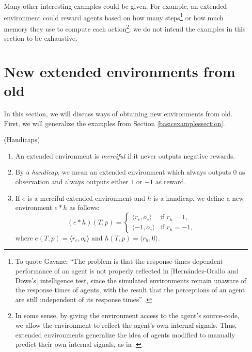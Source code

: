 \documentclass[runningheads]{llncs}
\begin{document}
Many other interesting examples could be given. For example, an extended environment
could reward agents based on how many steps\footnote{To quote
Gavane:
``The problem is that the response-times-dependent performance of an agent
is not properly reflected in [Hern{\'a}ndez-Orallo and Dowe's] intelligence test,
since the simulated environments remain unaware of the response times of agents,
with the result that the perceptions of an agent are still independent of its
response times'' \cite{gavane}.} or how much memory
they use to compute each action\footnote{In some sense, by giving the environment
access to the agent's source-code, we allow the environment to reflect the agent's
own internal signals. Thus, extended environments generalize the idea of
agents modified to manually predict their own internal signals, as in
\cite{sherstan2016introspective}.};
we do not intend the examples in this section to be exhaustive.

\section{New extended environments from old}
\label{newextendedenvironmentsfromoldsecn}

In this section, we will discuss ways of obtaining new environments from old.
First, we will generalize the examples from Section \ref{basicexamplessection}.

\begin{definition}
    (Handicaps)
    \begin{enumerate}
        \item
        An extended environment is \emph{merciful} if it never outputs negative rewards.
        \item
        By a \emph{handicap}, we mean an extended environment which always outputs $0$ as
        observation and always outputs either $1$ or $-1$ as reward.
        \item
        If $e$ is a merciful extended environment and $h$ is a handicap,
        we define a new environment $e*h$ as follows:
        \[
            (e*h)(T,p) =
            \begin{cases}
                \langle r_e, o_e\rangle &\mbox{if $r_h=1$},\\
                \langle -1, o_e\rangle &\mbox{if $r_h=-1$},
            \end{cases}
        \]
        where $e(T,p)=\langle r_e,o_e\rangle$ and $h(T,p)=\langle r_h,0\rangle$.
    \end{enumerate}
\end{definition}
\end{document}
